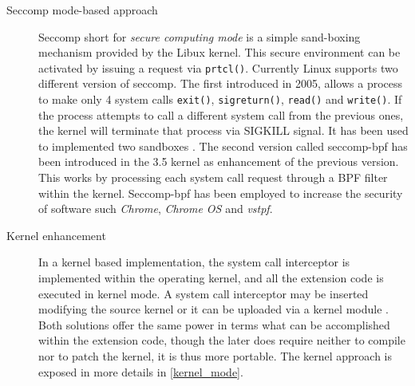 \begin{description}
\item[Seccomp mode-based approach] Seccomp short for \textit{secure computing mode}  is a simple sand-boxing mechanism provided by the Libux kernel. This secure environment can be activated by issuing a request via \lstinline$prtcl()$. Currently Linux supports two different version of seccomp. The first introduced in 2005, allows  a process to make only 4 system calls   \lstinline$exit()$,  \lstinline$sigreturn()$,  \lstinline$read()$ and  \lstinline$write()$. If the process attempts to call a different system call from the previous ones, the kernel will terminate that process via SIGKILL signal. It has been used to implemented two sandboxes \cite{seccompsandboxe, seccompnurse}. The second version called seccomp-bpf has been introduced in the 3.5 kernel as enhancement of the previous version. This works by processing each system call request through a BPF filter within the kernel. Seccomp-bpf has been employed to increase the security of software such \emph{Chrome}, \emph{Chrome OS}  and \emph{vstpf}.
  
\item[Kernel enhancement]In a kernel based implementation, the system call interceptor is implemented within the operating kernel, and all the extension code is executed in kernel mode. A system call interceptor may be inserted modifying the source kernel \cite{Noordende_asecure} or it can be uploaded via a kernel module \cite{Janus}. Both solutions offer the same power in terms what can be accomplished within the extension code, though the later does require neither to compile nor to patch the kernel, it is thus more portable. The kernel approach is exposed in more details in \ref{kernel_mode}.
\end{description}


